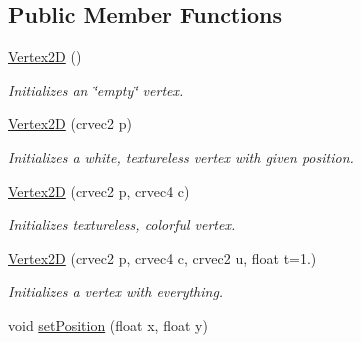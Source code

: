 \subsection*{Public Member Functions}
\begin{DoxyCompactItemize}
\item 
\mbox{\label{structnta_1_1Vertex2D_a696744d55f56ae170684266eab073c0f}} 
\hyperlink{structnta_1_1Vertex2D_a696744d55f56ae170684266eab073c0f}{Vertex2D} ()
\begin{DoxyCompactList}\small\item\em Initializes an \char`\"{}empty\char`\"{} vertex. \end{DoxyCompactList}\item 
\mbox{\label{structnta_1_1Vertex2D_ab0988223c10ad83057c4ade8891b4814}} 
\hyperlink{structnta_1_1Vertex2D_ab0988223c10ad83057c4ade8891b4814}{Vertex2D} (crvec2 p)
\begin{DoxyCompactList}\small\item\em Initializes a white, textureless vertex with given position. \end{DoxyCompactList}\item 
\mbox{\label{structnta_1_1Vertex2D_aa2e8619f157a72c64d2438f49ec65554}} 
\hyperlink{structnta_1_1Vertex2D_aa2e8619f157a72c64d2438f49ec65554}{Vertex2D} (crvec2 p, crvec4 c)
\begin{DoxyCompactList}\small\item\em Initializes textureless, colorful vertex. \end{DoxyCompactList}\item 
\mbox{\label{structnta_1_1Vertex2D_a1c2fe391aeb3ca6d0b8eebfbce1b5862}} 
\hyperlink{structnta_1_1Vertex2D_a1c2fe391aeb3ca6d0b8eebfbce1b5862}{Vertex2D} (crvec2 p, crvec4 c, crvec2 u, float t=1.)
\begin{DoxyCompactList}\small\item\em Initializes a vertex with everything. \end{DoxyCompactList}\item 
\mbox{\label{structnta_1_1Vertex2D_a7079a91fd386eb3e4425c965f2ce2592}} 
void \hyperlink{structnta_1_1Vertex2D_a7079a91fd386eb3e4425c965f2ce2592}{set\+Position} (float x, float y)

\end{DoxyCompactItemize}
